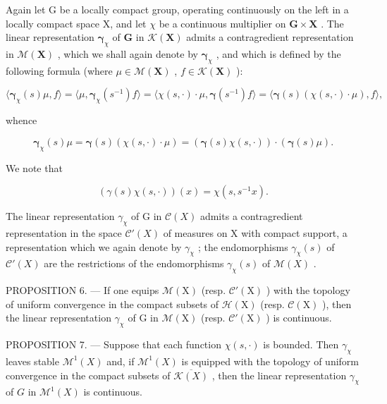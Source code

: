 Again let G be a locally compact group, operating continuously on the left in a locally compact space X, and let \(\chi\) be a continuous multiplier on \(\mathbf{G} \times \mathbf{X}\) . The linear representation \(\boldsymbol{\gamma}_{\chi}\) of \(\mathbf{G}\) in \(\mathcal{K}(\mathbf{X})\) admits a contragredient representation in \(\mathcal{M}(\mathbf{X})\) , which we shall again denote by \(\boldsymbol{\gamma}_{\chi}\) , and which is defined by the following formula (where \(\mu \in \mathcal{M}(\mathbf{X})\) , \(f \in \mathcal{K}(\mathbf{X})\) ):

\[
\langle \boldsymbol {\gamma} _ {\chi} (s) \mu , f \rangle = \langle \mu , \boldsymbol {\gamma} _ {\chi} (s ^ {- 1}) f \rangle = \langle \chi (s, \cdot) \cdot \mu , \boldsymbol {\gamma} (s ^ {- 1}) f \rangle = \langle \boldsymbol {\gamma} (s) (\chi (s, \cdot) \cdot \mu), f \rangle ,
\]

whence

\[
\boldsymbol {\gamma} _ {\chi} (s) \mu = \boldsymbol {\gamma} (s) (\chi (s, \cdot) \cdot \mu) = (\boldsymbol {\gamma} (s) \chi (s, \cdot)) \cdot (\boldsymbol {\gamma} (s) \mu).
\]

We note that

\[
\left(\gamma (s) \chi (s, \cdot)\right) (x) = \chi (s, s ^ {- 1} x).
\]

The linear representation \(\gamma_{\chi}\) of G in \(\mathcal{C}(X)\) admits a contragredient representation in the space \(\mathcal{C}'(X)\) of measures on X with compact support, a representation which we again denote by \(\gamma_{\chi}\) ; the endomorphisms \(\gamma_{\chi}(s)\) of \(\mathcal{C}'(X)\) are the restrictions of the endomorphisms \(\gamma_{\chi}(s)\) of \(\mathcal{M}(X)\) .

PROPOSITION 6. --- If one equips \(\mathcal{M}(\mathrm{X})\) (resp. \(\mathcal{C}'(\mathrm{X})\) ) with the topology of uniform convergence in the compact subsets of \(\mathcal{H}(\mathrm{X})\) (resp. \(\mathcal{C}(\mathrm{X})\) ), then the linear representation \(\gamma_{\chi}\) of \(\mathrm{G}\) in \(\mathcal{M}(\mathrm{X})\) (resp. \(\mathcal{C}'(\mathrm{X})\) ) is continuous.

PROPOSITION 7. --- Suppose that each function \(\chi(s,\cdot)\) is bounded. Then \(\gamma_{\chi}\) leaves stable \(\mathcal{M}^{1}(X)\) and, if \(\mathcal{M}^{1}(X)\) is equipped with the topology of uniform convergence in the compact subsets of \(\overline{\mathcal{K}(X)}\) , then the linear representation \(\gamma_{\chi}\) of \(G\) in \(\mathcal{M}^{1}(X)\) is continuous.

